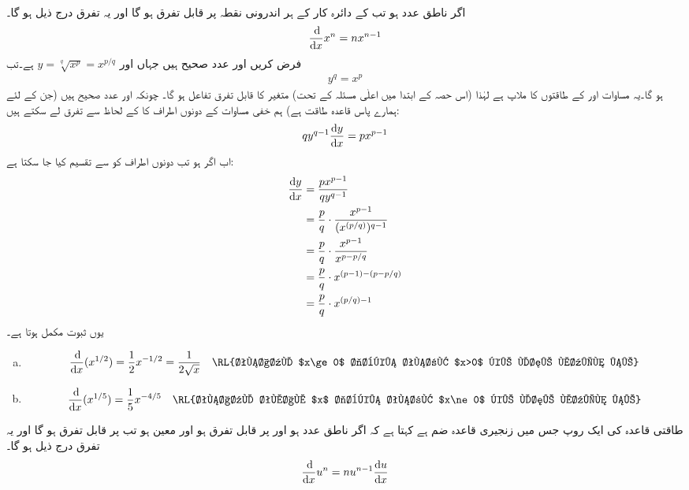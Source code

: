 \\
اگر  ناطق عدد ہو تب  کے دائرہ کار کے ہر اندرونی نقطہ  پر  قابل تفرق ہو گا اور یہ تفرق درج ذیل ہو گا۔
\begin{align*}
\frac{\dif}{\dif x}x^n=nx^{n-1}
\end{align*}
فرض کریں  اور  عدد صحیح ہیں جہاں  اور  
$y=\sqrt[q]{x^p}=x^{p/q}$
ہے۔تب 
\begin{align*}
y^q=x^p
\end{align*}
ہو گا۔یہ مساوات  اور  کے طاقتوں کا ملاپ ہے لہٰذا (اس حصہ کے ابتدا میں اعلٰی مسئلہ کے تحت)  متغیر  کا قابل تفرق تفاعل ہو گا۔ چونکہ  اور  عدد صحیح ہیں (جن کے لئے ہمارے پاس قاعدہ طاقت ہے) ہم خفی مساوات کے دونوں اطراف کا  کے لحاظ سے تفرق لے سکتے ہیں:
\begin{align*}
qy^{q-1}\frac{\dif y}{\dif x}=px^{p-1}
\end{align*} 
اب اگر  ہو تب دونوں اطراف کو  سے تقسیم کیا جا سکتا ہے:
\begin{align*}
\frac{\dif y}{\dif x}&=\frac{px^{p-1}}{qy^{q-1}}\\
&=\frac{p}{q}\cdot\frac{x^{p-1}}{(x^{(p/q)})^{q-1}}\\
&=\frac{p}{q}\cdot \frac{x^{p-1}}{x^{p-p/q}}\\
&=\frac{p}{q}\cdot x^{(p-1)-(p-p/q)}\\
&=\frac{p}{q}\cdot x^{{(p/q)-1}}
\end{align*}
یوں ثبوت مکمل ہوتا ہے۔
\begin{enumerate}[a.]

\item
\begin{align*}
\frac{\dif}{\dif x}(x^{1/2})=\frac{1}{2}x^{-1/2}=\frac{1}{2\sqrt{x}} &&\text{\RL{تفاعل $x\ge 0$  جبکہ تفرق $x>0$ کے لئے معین ہے}}
\end{align*}
\item
\begin{align*}
\frac{\dif}{\dif x}(x^{1/5})=\frac{1}{5}x^{-4/5}&&\text{\RL{تفاعل تمام $x$ جبکہ تفرق $x\ne 0$ کے لئے معین ہے}}
\end{align*}
\end{enumerate}
طاقتی قاعدہ کی ایک روپ جس میں زنجیری قاعدہ ضم ہے کہتا ہے کہ اگر  ناطق عدد ہو اور  پر  قابل تفرق ہو اور  معین ہو تب  پر  قابل تفرق ہو گا اور یہ تفرق درج ذیل ہو گا۔
\begin{align}
\frac{\dif}{\dif x} u^n=nu^{n-1}\frac{\dif u}{\dif x}
\end{align} 

